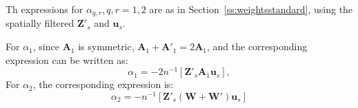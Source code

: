 \documentclass{article}
\begin{document}
Th expressions for $\alpha_{q,r}, q, r = 1,2$ are as in Section~\ref{ss:weightsstandard},
using the spatially filtered $\mathbf{Z'}_s$ and $\mathbf{u}_s$. 

For $\alpha_1$, since $\mathbf{A}_1$ is symmetric, $\mathbf{A}_1 + \mathbf{A'}_1 = 2 \mathbf{A}_1$, and the corresponding expression can be written as:
\begin{equation*}
\alpha_1 = - 2 n^{-1} [ \mathbf{Z'}_s \mathbf{A}_1 \mathbf{u}_s ],
\end{equation*}
 For $\alpha_2$, the corresponding expression is:
\begin{equation*}
 \alpha_2 = - n^{-1} [ \mathbf{Z'}_s (\mathbf{W} + \mathbf{W'} ) \mathbf{u}_s ]
\end{equation*}





\end{document}
